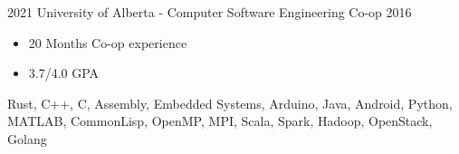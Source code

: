 
  

\begin{experiences}
    \experience
      {2021}   {University of Alberta - Computer Software Engineering Co-op}{}{}
      {2016} {
                        \begin{itemize}
                          \item 20 Months Co-op experience
                          \item 3.7/4.0 GPA
                        \end{itemize}
                      }
                      {
                        Rust,
                        C++,
                        C,
                        Assembly,
                        Embedded Systems,
                        Arduino,
                        Java,
                        Android,
                        Python,
                        MATLAB,
                        CommonLisp,
                        OpenMP,
                        MPI,
                        Scala,
                        Spark,
                        Hadoop,
                        OpenStack,
                        Golang
                      }
  
  \end{experiences}
